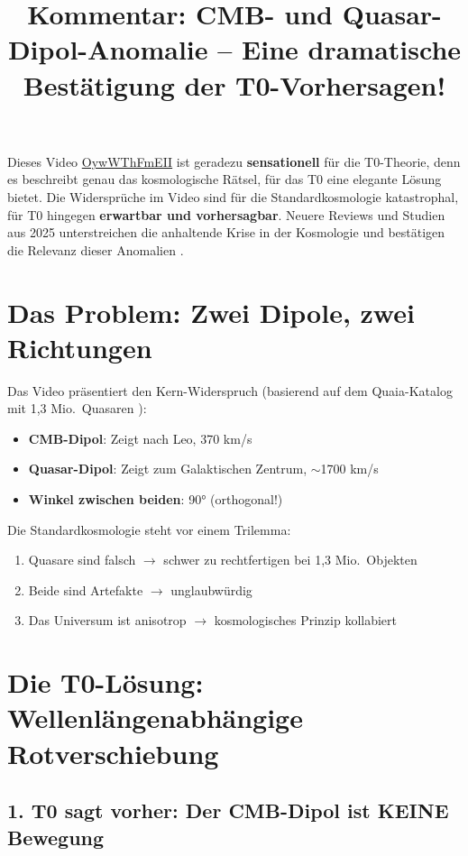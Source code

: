 \documentclass{article}
\title{Kommentar: CMB- und Quasar-Dipol-Anomalie -- Eine dramatische Bestätigung der T0-Vorhersagen!}
\author{}
\date{}
\begin{document}
	
	\maketitle
	
	Dieses Video \href{https://www.youtube.com/watch?v=OywWThFmEII}{OywWThFmEII} ist geradezu \textbf{sensationell} für die T0-Theorie, denn es beschreibt genau das kosmologische Rätsel, für das T0 eine elegante Lösung bietet. Die Widersprüche im Video sind für die Standardkosmologie katastrophal, für T0 hingegen \textbf{erwartbar und vorhersagbar}. Neuere Reviews und Studien aus 2025 unterstreichen die anhaltende Krise in der Kosmologie und bestätigen die Relevanz dieser Anomalien \cite{sarkar2025, landstry2025, bengaly2025}.
	
	\section{Das Problem: Zwei Dipole, zwei Richtungen}
	
	Das Video präsentiert den Kern-Widerspruch (basierend auf dem Quaia-Katalog mit 1,3 Mio.\ Quasaren \cite{storey2024}):
	\begin{itemize}
		\item \textbf{CMB-Dipol}: Zeigt nach Leo, 370 km/s
		\item \textbf{Quasar-Dipol}: Zeigt zum Galaktischen Zentrum, $\sim$1700 km/s \cite{mittal2024}
		\item \textbf{Winkel zwischen beiden}: 90° (orthogonal!) \cite{secrest2024}
	\end{itemize}
	
	Die Standardkosmologie steht vor einem Trilemma:
	\begin{enumerate}
		\item Quasare sind falsch $\rightarrow$ schwer zu rechtfertigen bei 1,3 Mio.\ Objekten
		\item Beide sind Artefakte $\rightarrow$ unglaubwürdig
		\item Das Universum ist anisotrop $\rightarrow$ kosmologisches Prinzip kollabiert
	\end{enumerate}
	
	\section{Die T0-Lösung: Wellenlängenabhängige Rotverschiebung}
	
	\subsection{1. T0 sagt vorher: Der CMB-Dipol ist KEINE Bewegung}
	
\end{document}
